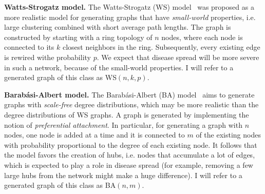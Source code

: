 \documentclass[11pt]{article} %
\begin{document}
\noindent\textbf{Watts-Strogatz model.} The Watts-Strogatz (WS)
model~\cite{watts} was proposed as a more realistic model for generating graphs
that have \emph{small-world} properties, i.e. large clustering combined with
short average path lengths. The graph is constructed by starting with a ring
topology of $n$ nodes, where each node is connected to its $k$ closest neighbors
in the ring. Subsequently, every existing edge is rewired withe probability $p$.
We expect that disease spread will be more severe in such a network, because
of the small-world properties. I will refer to a generated graph of this class
as WS$(n, k, p)$.

\noindent\textbf{Barabási-Albert model.} The Barabási-Albert (BA)
model~\cite{barabasi} aims to generate graphs with \emph{scale-free} degree
distributions, which may be more realistic than the degree distributions of
WS graphs. A graph is generated by implementing the notion of
\emph{preferential attachment}. In particular, for generating a graph with
$n$ nodes, one node is added at a time and it is connected to $m$ of the
existing nodes with probability proportional to the degree of each existing
node. It follows that the model favors the creation of hubs, i.e. nodes that
accumulate a lot of edges, which is expected to play a role in disease spread
(for example, removing a few large hubs from the network might make a huge
difference). I will refer to a generated graph of this class
as BA$(n, m)$.
\end{document}
